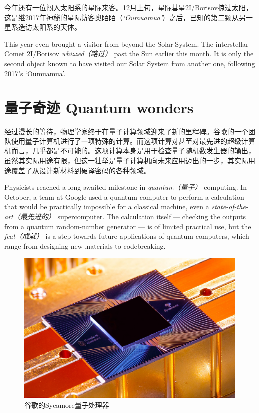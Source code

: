 \begin{multicols}{3}
今年还有一位闯入太阳系的星际来客。12月上旬，星际彗星2I/Borisov掠过太阳，这是继2017年神秘的星际访客奥陌陌（\textit{`Oumuamua'}）之后，已知的第二颗从另一星系造访太阳系的天体。

This year even brought a visitor from beyond the Solar System. The interstellar Comet 2I/Borisov \textit{whizzed（略过）} past the Sun earlier this month. It is only the second object known to have visited our Solar System from another one, following 2017's `Oumuamua'.

\section*{量子奇迹 Quantum wonders}

经过漫长的等待，物理学家终于在量子计算领域迎来了新的里程碑。谷歌的一个团队使用量子计算机进行了一项特殊的计算。而这项计算对甚至对最先进的超级计算机而言，几乎都是不可能的。这项计算本身是用于检查量子随机数发生器的输出，虽然其实际用途有限，但这一壮举是量子计算机向未来应用迈出的一步，其实际用途覆盖了从设计新材料到破译密码的各种领域。

Physicists reached a long-awaited milestone in \textit{quantum（量子）} computing. In October, a team at Google used a quantum computer to perform a calculation that would be practically impossible for a classical machine, even a \textit{state-of-the-art（最先进的）} supercomputer. The calculation itself — checking the outputs from a quantum random-number generator — is of limited practical use, but the \textit{feat（成就）} is a step towards future applications of quantum computers, which range from designing new materials to codebreaking.

\begin{figure}[H]
    \centering
    \includegraphics[width=\linewidth]{IMG/202001/1024.jpg}
    \caption{\kaishu 谷歌的Sycamore量子处理器}
    \label{fig:my_label}
\end{figure}


\end{multicols}
